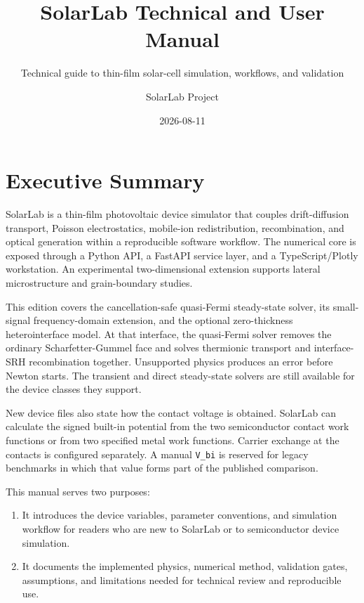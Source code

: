 \documentclass[
  11pt,
  american,
]{report}
\title{SolarLab Technical and User Manual}
\subtitle{Technical guide to thin-film solar-cell simulation, workflows,
and validation}
\author{SolarLab Project}
\date{2026-08-11}
\providecommand{\tightlist}{%
  \setlength{\itemsep}{0pt}\setlength{\parskip}{0pt}}
\begin{document}
\maketitle

{
\hypersetup{linkcolor=}
\setcounter{tocdepth}{2}
\tableofcontents
}
\listoffigures
\newpage

\hypertarget{executive-summary}{%
\chapter{Executive Summary}\label{executive-summary}}

SolarLab is a thin-film photovoltaic device simulator that couples
drift-diffusion transport, Poisson electrostatics, mobile-ion
redistribution, recombination, and optical generation within a
reproducible software workflow. The numerical core is exposed through a
Python API, a FastAPI service layer, and a TypeScript/Plotly
workstation. An experimental two-dimensional extension supports lateral
microstructure and grain-boundary studies.

This edition covers the cancellation-safe quasi-Fermi steady-state
solver, its small-signal frequency-domain extension, and the optional
zero-thickness heterointerface model. At that interface, the quasi-Fermi
solver removes the ordinary Scharfetter-Gummel face and solves
thermionic transport and interface-SRH recombination together.
Unsupported physics produces an error before Newton starts. The
transient and direct steady-state solvers are still available for the
device classes they support.

New device files also state how the contact voltage is obtained.
SolarLab can calculate the signed built-in potential from the two
semiconductor contact work functions or from two specified metal work
functions. Carrier exchange at the contacts is configured separately. A
manual \texttt{V\_bi} is reserved for legacy benchmarks in which that
value forms part of the published comparison.

This manual serves two purposes:

\begin{enumerate}
\def\labelenumi{\arabic{enumi}.}
\tightlist
\item
  It introduces the device variables, parameter conventions, and
  simulation workflow for readers who are new to SolarLab or to
  semiconductor device simulation.
\item
  It documents the implemented physics, numerical method, validation
  gates, assumptions, and limitations needed for technical review and
  reproducible use.
\end{enumerate}
\end{document}
